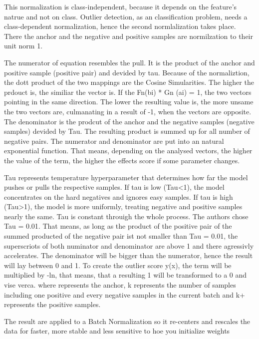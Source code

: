  
This normalization is class-independent, because it depends on the feature's natrue and not on class. 
Outlier detection, as an classification problem, needs a class-dependent normalization, hence the second normlalization takes place. 
There the anchor and the negative and positive samples are normilzation to their unit norm 1.


The numerator of equation resembles the pull.
It is the product of the anchor and positive sample (positive pair) and devided by tau.
Because of the normaliztion, the dott product of the two mappings are the Cosine Simularities.
The higher the prdouct is, the similiar the vector is.
If the Fn(bi) * Gn (ai) = 1, the two vectors pointing in the same direction. 
The lower the resulting value is, the more unsame the two vectors are, culmanating in a result of -1, when the vectors are opposite.
The denominator is the prodcut of the anchor and the negative samples (negative samples) devided by Tau. 
The resulting product is summed up for all number of negative pairs.
The numerator and denominator are put into an natural exponential function.
That means, depending on the analysed vectors, the higher the value of the term, the higher the effects score if some parameter changes.


Tau represents temperature hyperparameter that determines how far the model pushes or pulls the respective samples. 
If tau is low (Tau<1), the model concentrates on the hard negatives and ignores easy samples.
If tau is high (Tau>1), the model is more uniformly, treating negative and positive samples nearly the same.
Tau is constant throuigh the whole process. 
The authors chose Tau = 0.01.
That means, as long as the product of the positive pair of the summed producted of the negative pair ist not smaller than Tau = 0.01, the superscriots of both numinator and denominator are above 1 and there agressivly accelerates. 
The denominator will be bigger than the numerator, hence the result will lay between 0 and 1. 
To create the outlier score y(x), the term will be multiplied by -ln, that means, that a resulting 1 will be transformed to a 0 and vise verca.
where  represents the anchor, k represents the number of samples including one positive and every negative samples in the current batch and k+ represents the positive samples.




The result are applied to a Batch Normalization so it re-centers and rescales the data for faster, more stable and less sensitive to hoe you initialize weights



